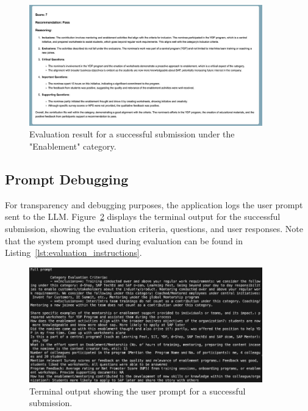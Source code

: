 \begin{figure}[H]
    \centering
    \includegraphics[width=0.9\textwidth]{img/pass.jpeg}
    \caption{Evaluation result for a successful submission under the "Enablement" category.}
    \label{fig:pass}
\end{figure}

\subsection{Prompt Debugging}
For transparency and debugging purposes, the application logs the user prompt sent to the \ac{LLM}. Figure~\ref{fig:prompt} displays the terminal output for the successful submission, 
showing the evaluation criteria, questions, and user responses. Note that the system prompt used during evaluation can be found in Listing~\ref{lst:evaluation_instructions}.

\begin{figure}[H]
    \centering
    \includegraphics[width=0.9\textwidth]{img/prompt.jpeg}
    \caption{Terminal output showing the user prompt for a successful submission.}
    \label{fig:prompt}
\end{figure}